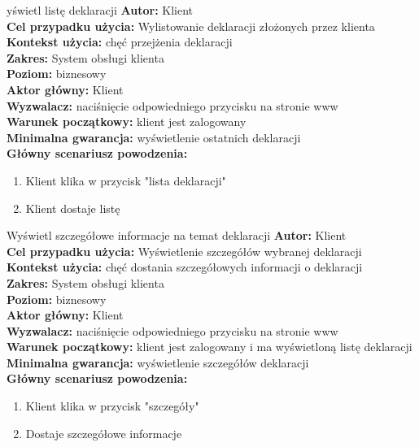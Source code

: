 \begin{usecase}{yświetl listę deklaracji}
	\textbf{Autor:} Klient\\
	\textbf{Cel przypadku użycia:} Wylistowanie deklaracji złożonych przez klienta \\
	\textbf{Kontekst użycia:} chęć przejżenia deklaracji\\
	\textbf{Zakres:} System obsługi klienta \\
	\textbf{Poziom:} biznesowy \\
	\textbf{Aktor główny:} Klient\\
	\textbf{Wyzwalacz:} naciśnięcie odpowiedniego przycisku na stronie www \\
	\textbf{Warunek początkowy:} klient jest zalogowany\\
	\textbf{Minimalna gwarancja:} wyświetlenie ostatnich deklaracji\\
	\textbf{Główny scenariusz powodzenia:} \\
		\begin{enumerate}
			\item Klient klika w przycisk "lista deklaracji"
			\item Klient dostaje listę
		\end{enumerate}
\end{usecase}

\begin{usecase}{Wyświetl szczegółowe informacje na temat deklaracji}
	\textbf{Autor:} Klient\\
	\textbf{Cel przypadku użycia:} Wyświetlenie szczegółów wybranej deklaracji \\
	\textbf{Kontekst użycia:} chęć dostania szczegółowych informacji o deklaracji\\
	\textbf{Zakres:} System obsługi klienta \\
	\textbf{Poziom:} biznesowy \\
	\textbf{Aktor główny:} Klient\\
	\textbf{Wyzwalacz:} naciśnięcie odpowiedniego przycisku na stronie www \\
	\textbf{Warunek początkowy:} klient jest zalogowany i ma wyświetloną listę deklaracji\\
	\textbf{Minimalna gwarancja:} wyświetlenie szczegółów deklaracji \\
	\textbf{Główny scenariusz powodzenia:} \\
		\begin{enumerate}
			\item Klient klika w przycisk "szczegóły"
			\item Dostaje szczegółowe informacje
		\end{enumerate}
\end{usecase}

